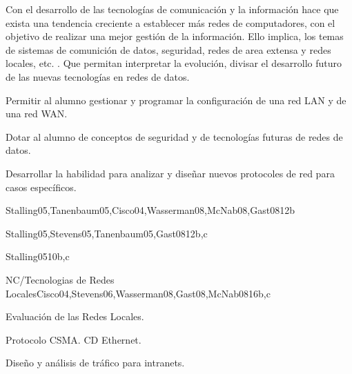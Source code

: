 \begin{syllabus}


\begin{justification}
Con el desarrollo de las tecnologías de comunicación   y la información
 hace que exista una tendencia creciente a  establecer  más redes de
 computadores,  con el objetivo de realizar una mejor gestión de la
 información.  Ello implica, los temas de sistemas de comunición de  datos,
  seguridad, redes de area extensa  y redes  locales, etc.  . Que permitan
  interpretar la  evolución, divisar  el desarrollo  futuro de las
  nuevas  tecnologías en redes de datos.
\end{justification}

\begin{goals}
\item Permitir al alumno gestionar y programar la configuración de una red LAN y de una red WAN.
\item Dotar al alumno de conceptos de seguridad y de tecnologías futuras de redes de datos.
\item Desarrollar la habilidad para analizar y diseñar nuevos protocoles de red para casos específicos.
\end{goals}

\begin{outcomes}
\end{outcomes}

\begin{unit}{\NCIntroductionDef}{Stalling05,Tanenbaum05,Cisco04,Wasserman08,McNab08,Gast08}{12}{b}
   \NCIntroductionAllTopics
   \NCIntroductionAllObjectives
\end{unit}

\begin{unit}{\NCNetworkCommunicationDef}{Stalling05,Stevens05,Tanenbaum05,Gast08}{12}{b,c}
   \NCNetworkCommunicationAllTopics
   \NCNetworkCommunicationAllObjectives
\end{unit}

\begin{unit}{\NCCompressionDef}{Stalling05}{10}{b,c}
	\NCCompressionAllTopics
	\NCCompressionAllObjectives
\end{unit}

\begin{unit}{NC/Tecnologias de Redes Locales}{Cisco04,Stevens06,Wasserman08,Gast08,McNab08}{16}{b,c}
   \begin{topics}
      \item Evaluación de las  Redes  Locales.
      \item Protocolo CSMA. CD Ethernet.
      \item Diseño y  análisis de  tráfico para intranets.
   \end{topics}


\end{unit}
\end{syllabus}
